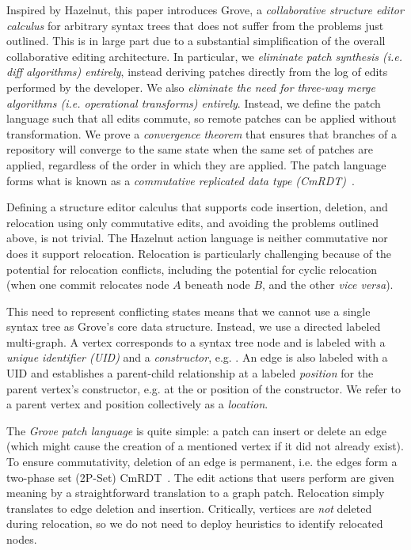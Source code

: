 Inspired by Hazelnut, this paper introduces Grove, a \emph{collaborative structure editor calculus} for arbitrary syntax trees that does not suffer from the problems just outlined. 
This is in large part due to a substantial simplification of the overall collaborative
editing architecture. In particular, we \emph{eliminate patch synthesis (i.e. diff algorithms) entirely}, 
instead deriving patches directly from the log of edits performed by the developer. 
We also \emph{eliminate the need for three-way merge algorithms (i.e. operational transforms) entirely}.
Instead, we define the patch language such that all edits commute, 
so remote patches can be applied without transformation. 
We prove a \emph{convergence theorem} that ensures that branches of a repository will converge to the same state 
when the same set of patches are applied, regardless of the order in which they are applied.
The patch language forms what is known as a \emph{commutative replicated data type (CmRDT)}~\cite{preguicca2018conflict,shapiro2011conflict}.

Defining a structure editor calculus that supports code insertion, deletion, and relocation using only commutative edits, and avoiding the problems outlined above, is not trivial. The Hazelnut action language is neither commutative nor does it support relocation. 
Relocation is particularly challenging because of the potential for relocation conflicts,
including the potential for cyclic relocation (when one commit relocates node $A$ beneath node $B$, and the other \emph{vice versa}). 

This need to represent conflicting states means that we cannot use a single syntax tree as Grove's 
core data structure. Instead, we use a directed labeled multi-graph. A vertex corresponds to a syntax tree node and is labeled with a \emph{unique identifier (UID)} and a \emph{constructor}, e.g. . An edge is also labeled with a UID and establishes a parent-child relationship at a labeled \emph{position} for the parent vertex's constructor, e.g. at the  or  position of the  constructor. We refer to a parent vertex and position collectively as a \emph{location}.

The \emph{Grove patch language} is quite simple: a patch can insert or delete an edge (which might cause the creation of a mentioned vertex if it did not already exist). 
To ensure commutativity, deletion of an edge is permanent, i.e.
the edges form a two-phase set (2P-Set) CmRDT~\cite{shapiro2011conflict}. The edit actions that users perform are given meaning by a straightforward translation to a graph patch. 
Relocation simply translates to 
edge deletion and insertion. Critically, vertices are \emph{not} deleted during relocation,
so we do not need to deploy heuristics to identify relocated nodes.

